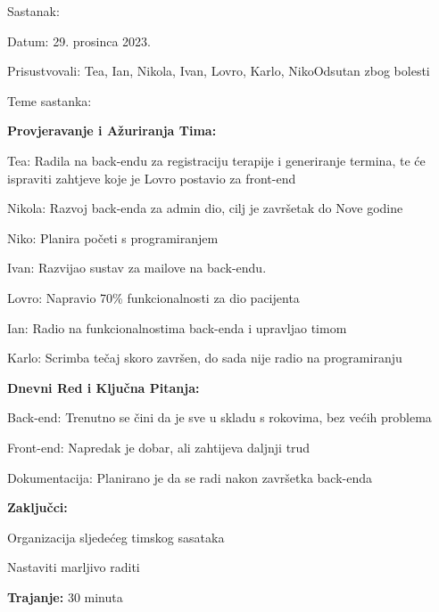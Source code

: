 \begin{packed_enum}
    \item Sastanak:
    \item[] \begin{packed_item}
        \item Datum: 29. prosinca 2023.
        \item Prisustvovali: Tea, Ian, Nikola, Ivan, Lovro, Karlo, NikoOdsutan zbog bolesti
        \item Teme sastanka:
            \begin{packed_item}
                \item \textbf{Provjeravanje i Ažuriranja Tima:}
                    \begin{packed_item}
                        \item Tea: Radila na back-endu za registraciju terapije i generiranje termina, te će ispraviti zahtjeve koje je Lovro postavio za front-end
                        \item Nikola: Razvoj back-enda za admin dio, cilj je završetak do Nove godine
                        \item Niko: Planira početi s programiranjem
                        \item Ivan: Razvijao sustav za mailove na back-endu.
                        \item Lovro: Napravio 70\% funkcionalnosti za dio pacijenta
                        \item Ian: Radio na funkcionalnostima back-enda i upravljao timom
                        \item Karlo: Scrimba tečaj skoro završen, do sada nije radio na programiranju
                    \end{packed_item}
                \item \textbf{Dnevni Red i Ključna Pitanja:}
                    \begin{packed_item}
                        \item Back-end: Trenutno se čini da je sve u skladu s rokovima, bez većih problema
                        \item Front-end: Napredak je dobar, ali zahtijeva daljnji trud
                        \item Dokumentacija: Planirano je da se radi nakon završetka back-enda
                    \end{packed_item}
                \item \textbf{Zaključci:}
                    \begin{packed_item}
                        \item Organizacija sljedećeg timskog sasataka
                        \item Nastaviti marljivo raditi
                    \end{packed_item}
                \item \textbf{Trajanje:} 30 minuta
            \end{packed_item}
    \end{packed_item}


\end{packed_enum}
